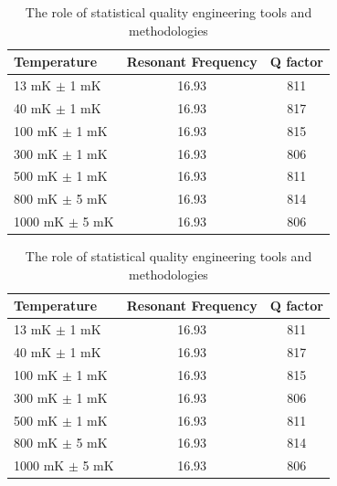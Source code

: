 \documentclass[oneside]{utmthesis}
\begin{document}
\begin{table}[!ht]
\centering
\caption{The role of statistical quality engineering tools and methodologies}
\vspace{\baselineskip}
\begin{tabular}{l c c}
  \hline
  \hline
  Temperature & Resonant Frequency & Q factor\\
  \hline
  13 mK $\pm$ 1 mK & 16.93 & 811 \\
  40 mK $\pm$ 1 mK & 16.93 & 817 \\
  100 mK $\pm$ 1 mK & 16.93 & 815 \\
  300 mK $\pm$ 1 mK & 16.93 & 806\\
  500 mK $\pm$ 1 mK & 16.93 & 811\\
  800 mK $\pm$ 5 mK & 16.93 & 814\\
  1000 mK $\pm$ 5 mK & 16.93 & 806 \\
  \hline
  \hline
\end{tabular}
\end{table}

\begin{landscape}
\begin{table}[p]
\centering
\caption{The role of statistical quality engineering tools and methodologies}
\vspace{\baselineskip}
\begin{tabular}{l c c}
  \hline
  \hline
  Temperature & Resonant Frequency & Q factor\\
  \hline
  13 mK $\pm$ 1 mK & 16.93 & 811 \\
  40 mK $\pm$ 1 mK & 16.93 & 817 \\
  100 mK $\pm$ 1 mK & 16.93 & 815 \\
  300 mK $\pm$ 1 mK & 16.93 & 806\\
  500 mK $\pm$ 1 mK & 16.93 & 811\\
  800 mK $\pm$ 5 mK & 16.93 & 814\\
  1000 mK $\pm$ 5 mK & 16.93 & 806 \\
  \hline
  \hline
\end{tabular}
\end{table}
\end{landscape}
\end{document}
